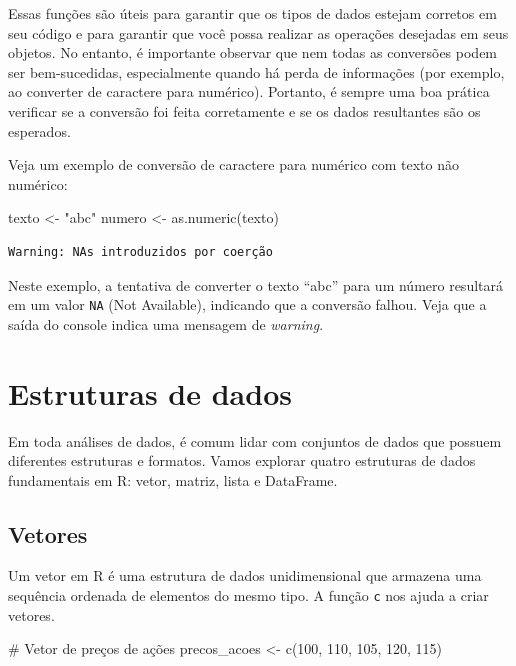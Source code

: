 \documentclass[
  letterpaper,
  DIV=11,
  numbers=noendperiod]{scrreprt}
\newenvironment{Shaded}{\begin{snugshade}}{\end{snugshade}}
\newcommand{\CommentTok}[1]{\textcolor[rgb]{0.37,0.37,0.37}{#1}}
\newcommand{\DecValTok}[1]{\textcolor[rgb]{0.68,0.00,0.00}{#1}}
\newcommand{\FunctionTok}[1]{\textcolor[rgb]{0.28,0.35,0.67}{#1}}
\newcommand{\NormalTok}[1]{\textcolor[rgb]{0.00,0.23,0.31}{#1}}
\newcommand{\OtherTok}[1]{\textcolor[rgb]{0.00,0.23,0.31}{#1}}
\newcommand{\StringTok}[1]{\textcolor[rgb]{0.13,0.47,0.30}{#1}}
\begin{document}
Essas funções são úteis para garantir que os tipos de dados estejam
corretos em seu código e para garantir que você possa realizar as
operações desejadas em seus objetos. No entanto, é importante observar
que nem todas as conversões podem ser bem-sucedidas, especialmente
quando há perda de informações (por exemplo, ao converter de caractere
para numérico). Portanto, é sempre uma boa prática verificar se a
conversão foi feita corretamente e se os dados resultantes são os
esperados.

Veja um exemplo de conversão de caractere para numérico com texto não
numérico:

\begin{Shaded}
\begin{Highlighting}[]
\NormalTok{texto }\OtherTok{\textless{}{-}} \StringTok{"abc"}
\NormalTok{numero }\OtherTok{\textless{}{-}} \FunctionTok{as.numeric}\NormalTok{(texto)}
\end{Highlighting}
\end{Shaded}

\begin{verbatim}
Warning: NAs introduzidos por coerção
\end{verbatim}

Neste exemplo, a tentativa de converter o texto ``abc'' para um número
resultará em um valor \texttt{NA} (Not Available), indicando que a
conversão falhou. Veja que a saída do console indica uma mensagem de
\emph{warning}.

\hypertarget{estruturas-de-dados}{%
\section{Estruturas de dados}\label{estruturas-de-dados}}

Em toda análises de dados, é comum lidar com conjuntos de dados que
possuem diferentes estruturas e formatos. Vamos explorar quatro
estruturas de dados fundamentais em R: vetor, matriz, lista e DataFrame.

\hypertarget{vetores}{%
\subsection{Vetores}\label{vetores}}

Um vetor em R é uma estrutura de dados unidimensional que armazena uma
sequência ordenada de elementos do mesmo tipo. A função \texttt{c} nos
ajuda a criar vetores.

\begin{Shaded}
\begin{Highlighting}[]
\CommentTok{\# Vetor de preços de ações}
\NormalTok{precos\_acoes }\OtherTok{\textless{}{-}} \FunctionTok{c}\NormalTok{(}\DecValTok{100}\NormalTok{, }\DecValTok{110}\NormalTok{, }\DecValTok{105}\NormalTok{, }\DecValTok{120}\NormalTok{, }\DecValTok{115}\NormalTok{)}
\end{Highlighting}
\end{Shaded}
\end{document}

